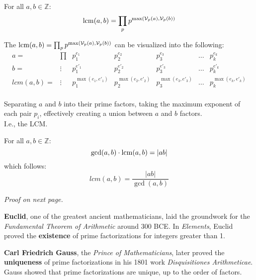 \newpage

\begin{theo}

    \label{theo:LCM_abstracted}

    For all $a,b\in\mathbb{Z}$:
    \[\operatorname{lcm}(a,b) = \prod_{p} p^{\max(\mathcal{V}_p(a),\mathcal{V}_p(b))}\]
\end{theo}

\begin{Proof}

    \label{proof:lcm_abstracted}

    The $\operatorname{lcm}(a,b) = \prod_{p} p^{\max(\mathcal{V}_p(a),\mathcal{V}_p(b))}$ can be visualized into the following:
    \[
    \begin{array}{ccc|c|c|c|c}
    
    a=&\prod&p_1^{e_1} & p_2^{e_2} & p_3^{e_3} & \dots & p_k^{e_k} \\
    b=&\vdots&p_1^{e'_1} & p_2^{e'_2} & p_3^{e'_3} & \dots & p_k^{e'_k} \\
    \hline
    lcm(a,b)=&\vdots&p_1^{\max(e_1, e'_1)} & p_2^{\max(e_2, e'_2)} & p_3^{\max(e_3, e'_3)} & \dots & p_k^{\max(e_k, e'_k)} \\

    \end{array}
    \]

    \noindent
    Separating $a$ and $b$ into their prime factors, taking the maximum exponent of each pair $p_i$,
    effectively creating a union between $a$ and $b$ factors.\\
    
    \noindent
    I.e., the LCM.
\end{Proof}

\begin{theo}

    \label{theo:gcd_lcm_relationship}

    For all $a,b\in\mathbb{Z}$:
    \[\gcd(a,b)\cdot\operatorname{lcm}(a,b) = |ab|\]
    which follows:
    \LARGE \[lcm(a,b) = \dfrac{|ab|}{\gcd(a,b)}\]
\end{theo}

\begin{center}
    \textit{Proof on next page.}
\end{center}

\begin{Tip}
    \textbf{Euclid}, one of the greatest ancient mathematicians, laid the groundwork for the \textit{Fundamental Theorem of Arithmetic} around 300 BCE. In \textit{Elements}, Euclid proved the \textbf{existence} of prime factorizations for integers greater than 1.
    
    \textbf{Carl Friedrich Gauss}, the \textit{Prince of Mathematicians}, later proved the \textbf{uniqueness} of prime factorizations in his 1801 work \textit{Disquisitiones Arithmeticae}. Gauss showed that prime factorizations are unique, up to the order of factors.
    \end{Tip}
    
